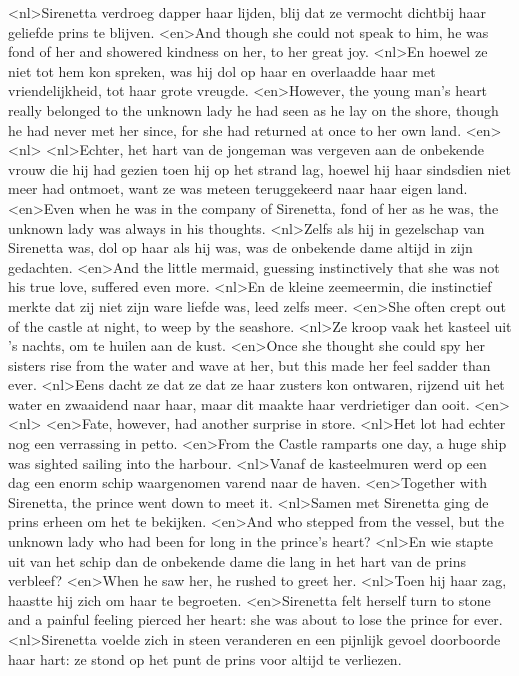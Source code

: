 <nl>Sirenetta verdroeg dapper haar lijden, blij dat ze vermocht dichtbij haar geliefde prins te blijven.
<en>And though she could not speak to him, he was fond of her and showered kindness on her, to her great joy.
<nl>En hoewel ze niet tot hem kon spreken, was hij dol op haar en overlaadde haar met vriendelijkheid, tot haar grote vreugde.
<en>However, the young man’s heart really belonged to the unknown lady he had seen as he lay on the shore, though he had never met her since, for she had returned at once to her own land.
<en>
<nl>
<nl>Echter, het hart van de jongeman was vergeven aan de onbekende vrouw die hij had gezien toen hij op het strand lag, hoewel hij haar sindsdien niet meer had ontmoet, want ze was meteen teruggekeerd naar haar eigen land.
<en>Even when he was in the company of Sirenetta, fond of her as he was, the unknown lady was always in his thoughts.
<nl>Zelfs als hij in gezelschap van Sirenetta was, dol op haar als hij was, was de onbekende dame altijd in zijn gedachten.
<en>And the little mermaid, guessing instinctively that she was not his true love, suffered even more.
<nl>En de kleine zeemeermin, die instinctief merkte dat zij niet zijn ware liefde was, leed zelfs meer.
<en>She often crept out of the castle at night, to weep by the seashore.
<nl>Ze kroop  vaak het kasteel uit 's nachts, om te huilen aan de kust.
<en>Once she thought she could spy her sisters rise from the water and wave at her, but this made her feel sadder than ever.
<nl>Eens dacht ze dat ze dat ze  haar zusters kon ontwaren, rijzend  uit het water en zwaaidend naar haar, maar dit maakte haar verdrietiger dan ooit.
<en>
<nl>
<en>Fate, however, had another surprise in store.
<nl>Het lot had echter nog een verrassing in petto.
<en>From the Castle ramparts one day, a huge ship was sighted sailing into the harbour.
<nl>Vanaf de kasteelmuren  werd op een dag een enorm schip waargenomen varend naar de haven.
<en>Together with Sirenetta, the prince went down to meet it.
<nl>Samen met Sirenetta ging de prins erheen om het te bekijken.
<en>And who stepped from the vessel, but the unknown lady who had been for long in the prince’s heart?
<nl>En wie stapte uit van het schip dan de onbekende dame die lang in het hart van de prins verbleef?
<en>When he saw her, he rushed to greet her.
<nl>Toen hij haar zag, haastte hij zich om haar te begroeten.
<en>Sirenetta felt herself turn to stone and a painful feeling pierced her heart: she was about to lose the prince for ever.
<nl>Sirenetta voelde  zich in steen veranderen en een pijnlijk gevoel doorboorde haar hart: ze stond op het punt de prins voor altijd te verliezen.
